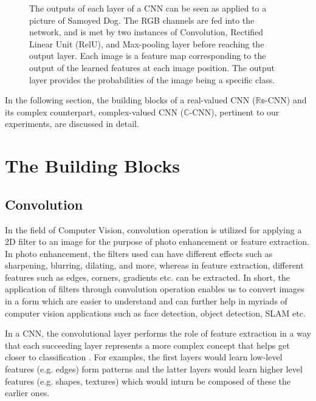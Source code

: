 \begin{figure}[htb]
	\centering
	\epsfxsize=15cm
	{}
	\caption{The outputs of each layer of a CNN can be seen as applied to a picture of Samoyed Dog. The RGB channels are fed into the network, and is met by two instances of Convolution, Rectified Linear Unit (RelU), and Max-pooling layer before reaching the output layer. Each image is a feature map corresponding to the output of the learned features at each image position. The output layer provides the probabilities of the image being a specific class. \cite{bloggg}}
	\label{fig:cnn}
\end{figure}


 
 In the following section, the building blocks of a real-valued CNN ($\mathbb{Re}$-CNN) and its complex counterpart, complex-valued CNN ($\mathbb{C}$-CNN), pertinent to our experiments, are discussed in detail.
 
 \section{The Building Blocks}
 
 
 
 \subsection{Convolution}\label{conv}
  In the field of Computer Vision, convolution operation is utilized for applying a 2D filter to an image for the purpose of photo enhancement or feature extraction. In photo enhancement, the filters used can have different effects such as sharpening, blurring, dilating, and more, whereas in feature extraction, different features such as edges, corners, gradients etc. can be extracted. In short, the application of filters through convolution operation enables us to convert images in a form which are easier to understand and can further help in myriads of computer vision applications such as face detection, object detection, SLAM etc. 
  
  In a CNN, the convolutional layer performs the role of feature extraction in a way that each succeeding layer represents a more complex concept that helps get closer to classification \cite{nature}. For examples, the first layers would learn low-level features (e.g. edges) form patterns and the latter layers would learn higher level features (e.g. shapes, textures) which would inturn be composed of these the earlier ones. 

